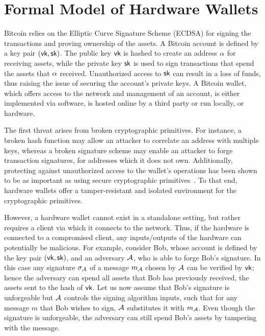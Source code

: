 \section{Formal Model of Hardware Wallets}\label{sec:hw_example}

Bitcoin relies on the Elliptic Curve Signature Scheme (ECDSA) for signing the
transactions and proving ownership of the assets. A Bitcoin account is defined
by a key pair $(\mathsf{vk}, \mathsf{sk})$. The public key $\mathsf{vk}$ is hashed to create an
address $\alpha$ for receiving assets, while the private key $\mathsf{sk}$ is used
to sign transactions that spend the assets that $\alpha$ received. Unauthorized
access to $\mathsf{sk}$ can result in a loss of funds, thus raising the issue of
securing the account's private keys. A Bitcoin wallet, which offers access to
the network and management of an account, is either implemented via software,
\ie is hosted online by a third party or run locally, or hardware.

The first threat arises from broken cryptographic primitives. For instance, a
broken hash function may allow an attacker to correlate an address with
multiple keys, whereas a broken signature scheme may enable an attacker to
forge transaction signatures, for addresses which it does not own.
Additionally, protecting against unauthorized access to the wallet's operations
has been shown to be as important as using secure cryptographic
primitives~\cite{SP:BMCNKF15,ISC:GkaAraKia17}. To that end, hardware wallets
offer a tamper-resistant and isolated environment for the cryptographic
primitives.

However, a hardware wallet cannot exist in a standalone setting, but rather
requires a client via which it connects to the network. Thus, if the hardware
is connected to a compromised client, any inputs/outputs of the hardware can
potentially be malicious. For example, consider Bob, whose account is defined
by the key pair $(\mathsf{vk}, \mathsf{sk})$, and an adversary $\mathcal{A}$, who is able to forge
Bob's signature. In this case any signature $\sigma_{\mathcal{A}}$ of a message
$m_{\mathcal{A}}$ chosen by $\mathcal{A}$ can be verified by $\mathsf{vk}$; hence the
adversary can spend all assets that Bob has previously received, \ie the assets
sent to the hash of $\mathsf{vk}$. Let us now assume that Bob's signature is
unforgeable  but $\mathcal{A}$ controls the signing algorithm inputs, such that
for any message $m$ that Bob wishes to sign, $\mathcal{A}$ substitutes it with
$m_{\mathcal{A}}$. Even though the signature is unforgeable, the adversary can
still spend Bob's assets by tampering with the message.

